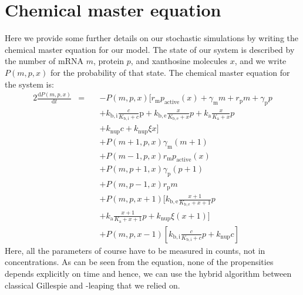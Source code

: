 \documentclass[10pt,letterpaper]{article}
\newcommand{\n}[1]{\mathrm{#1}}
\newcommand{\dd}[2]{\frac{\mathrm{d} #1}{\mathrm{d} #2}}
\begin{document}
\section{Chemical master equation}
Here we provide some further details on our stochastic simulations by writing the chemical master equation for our model. The state of our system is described by the number of mRNA $m$, protein $p$, and xanthosine molecules $x$, and we write $P(m,p,x)$ for the probability of that state. The chemical master equation for the system is:
\begin{alignat}{2}
\dd{P(m,p,x)}{t} &= \ && - P(m,p,x) [ r_{\n{m}} p_{\n{active}}(x) + \gamma_{\n{m}} m + r_{\n{p}} m + \gamma_{\n{p}} p \nonumber \\ & && + k_{\n{b,i}} \frac{c}{K_{\n{b,i}} + c} \n{p} + k_{\n{b,e}} \frac{x}{K_{\n{b,e}} + x} p + k_{\n{a}} \frac{x}{K_{\n{a}} + x} p \nonumber \\ & && + k_{\n{nup}} c + k_{\n{nup}} \xi x ] \nonumber \\ & && 
+ P(m+1,p,x) \gamma_{\n{m}} (m + 1) \nonumber \\ & &&  + P(m-1,p,x) r_{\n{m}} p_{\n{active}}(x) \nonumber \\ & && 
+ P(m,p+1,x) \gamma_{\n{p}} (p + 1) \nonumber \\ & &&  + P(m,p-1,x) r_{\n{p}} m \nonumber \\ & && 
+ P(m,p,x+1) [ k_{\n{b,e}} \frac{x+1}{K_{\n{b,e}} + x+1} p \nonumber \\ & && + k_{\n{a}} \frac{x+1}{K_{\n{a}} + x+1} p + k_{\n{nup}} \xi (x+1) ] \nonumber \\ & &&
+ P(m,p,x-1) [ k_{\n{b,i}} \frac{c}{K_{\n{b,i}} + c} p + k_{\n{nup}} c ]  
\end{alignat}
Here, all the parameters of course have to be measured in counts, not in concentrations. As can be seen from the equation, none of the propensities depends explicitly on time and hence, we can use the hybrid algorithm between classical Gillespie and \texttau-leaping that we relied on.

\FloatBarrier
\end{document}
